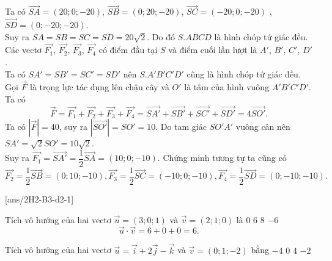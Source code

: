 \begin{vd}
{\begin{center}
		\end{center}
		Ta có $\overrightarrow{SA} = (20; 0; -20)$, $\overrightarrow{SB} = (0; 20; -20)$, $\overrightarrow{SC} = (-20; 0; -20)$ , $\overrightarrow{SD} = (0; -20; -20)$.\\
		Suy ra $SA = SB = SC = SD = 20\sqrt{2}$. Do đó $S.ABCD$ là hình chóp tứ giác đều.
		Các vectơ $\overrightarrow{F_1}$, $\overrightarrow{F_2}$, $\overrightarrow{F_3}$, $\overrightarrow{F_4}$ có điểm đầu tại $S$ và điểm cuối lần lượt là $A'$, $B'$, $C'$, $D'$.\\
		Ta có $SA' = SB' = SC' = SD'$ nên $S.A'B'C'D'$ cũng là hình chóp tứ giác đều.\\
		Gọi $\overrightarrow{F} $ là trọng lực tác dụng lên chậu cây và $O'$ là tâm của hình vuông $A'B'C'D'$. Ta có
		\[ \overrightarrow{F} =\overrightarrow{F_1} + \overrightarrow{F_2}+ \overrightarrow{F_3}+ \overrightarrow{F_4} = \overrightarrow{SA'} + \overrightarrow{SB'}+ \overrightarrow{SC'}+ \overrightarrow{SD'} = 4\overrightarrow{SO'}.\]
		Ta có $\left| \overrightarrow{F} \right| =40$, suy ra $\left| \overrightarrow{SO'} \right| = SO' = 10$.
		Do tam giác $SO'A'$ vuông cân nên $SA' = \sqrt{2}SO' = 10\sqrt{2}$.\\
		Suy ra $\overrightarrow{F_1} = \overrightarrow{SA'} = \dfrac{1}{2}\overrightarrow{SA}  = (10; 0; -10)$.
		Chứng minh tương tự ta cũng có\\
		\[ \overrightarrow{F_2} = \dfrac{1}{2}\overrightarrow{SB}  = (0; 10; -10), \overrightarrow{F_3} = \dfrac{1}{2}\overrightarrow{SC}  = (-10; 0; -10), \overrightarrow{F_4} = \dfrac{1}{2}\overrightarrow{SD}  = (0; -10; -10). \]
	}
\end{vd}
\BTTN
{}[ans/2H2-B3-d2-1]

\begin{ex}
	Tích vô hướng của hai vectơ $\vec{u}=(3;0;1)$ và $\vec{v}=(2;1;0)$ là
	\choice
	{$0$}
	{\True$6$}
	{$8$}
	{$-6$}
	\loigiai
	{
		$$\vec{u}\cdot\vec{v}=6+0+0=6.$$
	}
\end{ex} 

\begin{ex}
	Tích vô hướng của hai vectơ $\vec{u} = \vec{i} + 2 \vec{j} - \vec{k}$ và $ \vec{v} = (0;1; -2)$ bằng
	\choice
	{$ -4 $}
	{$ 0 $}
	{\True $ 4 $}
	{$ -2 $}
\end{ex} 


